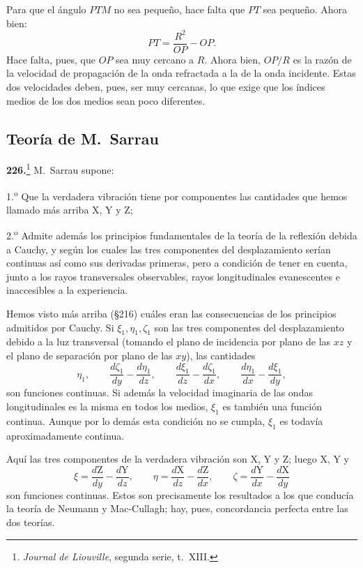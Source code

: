 Para que el ángulo $PTM$ no sea pequeño, hace falta que $PT$ sea pequeño.
Ahora bien:
\[
PT=\frac{R^2}{OP}-OP.
\]
Hace falta, pues, que $OP$ sea muy cercano a $R$. Ahora bien, $OP/R$ es la
razón de la velocidad de propagación de la onda refractada a la de la
onda incidente. Estas dos velocidades deben, pues, ser muy cercanas, lo
que exige que los índices medios de los dos medios sean poco diferentes.

\subsection{Teoría de M.~Sarrau}
\label{sec:reflexion-sarrau}

\noindent\textbf{226.}\footnote{\emph{Journal de Liouville}, segunda
serie, t.~XIII.} M.~Sarrau supone:

1.\textsuperscript{o} Que la verdadera vibración tiene por componentes las
cantidades que hemos llamado más arriba X, Y y Z;

2.\textsuperscript{o} Admite además los principios fundamentales de la teoría de la
reflexión debida a Cauchy, y según los cuales las tres componentes del
desplazamiento serían continuas así como sus derivadas primeras, pero a
condición de tener en cuenta, junto a los rayos transversales
observables, rayos longitudinales evanescentes e inaccesibles a la
experiencia.

Hemos visto más arriba (§216) cuáles eran las consecuencias de los
principios admitidos por Cauchy. Si $\xi_1,\eta_1,\zeta_1$ son las tres
componentes del desplazamiento debido a la luz transversal (tomando el
plano de incidencia por plano de las $xz$ y el plano de separación por
plano de las $xy$), las cantidades
\[
\eta_1,\qquad \frac{d\zeta_1}{dy}-\frac{d\eta_1}{dz},\qquad
\frac{d\xi_1}{dz}-\frac{d\zeta_1}{dx},\qquad
\frac{d\eta_1}{dx}-\frac{d\xi_1}{dy},
\]
son funciones continuas. Si además la velocidad imaginaria de las ondas
longitudinales es la misma en todos los medios, $\xi_1$ es también una
función continua. Aunque por lo demás esta condición no se cumpla,
$\xi_1$ es todavía aproximadamente continua.

Aquí las tres componentes de la verdadera vibración son X, Y y Z; luego
X, Y y
\[
\xi=\frac{d\mathrm{Z}}{dy}-\frac{d\mathrm{Y}}{dz},\qquad
\eta=\frac{d\mathrm{X}}{dz}-\frac{d\mathrm{Z}}{dx},\qquad
\zeta=\frac{d\mathrm{Y}}{dx}-\frac{d\mathrm{X}}{dy}
\]
son funciones continuas. Estos son precisamente los resultados a los que
conducía la teoría de Neumann y Mac-Cullagh; hay, pues, concordancia
perfecta entre las dos teorías.


